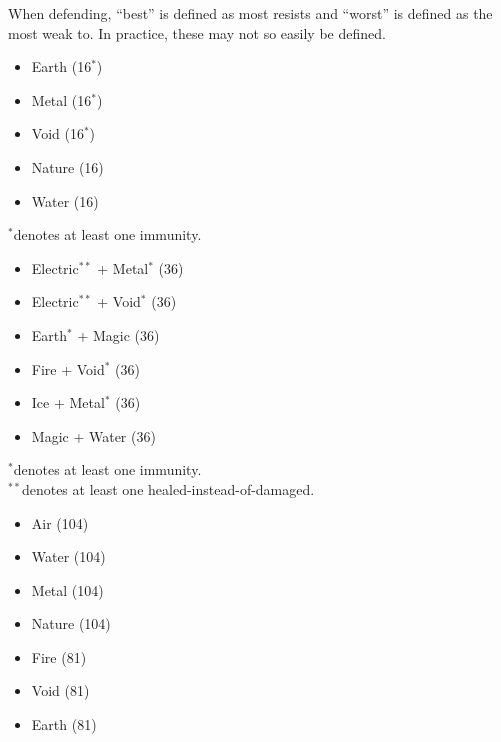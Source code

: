 When defending, ``best'' is defined as most resists and ``worst'' is defined as the most weak to. In practice, these may not so easily be defined.

\begin{itemize}
	\item{Earth (16$^*$)}
	\item{Metal (16$^*$)}
	\item{Void (16$^*$)}
	\item{Nature (16)}
	\item{Water (16)}
\end{itemize}
$^*$denotes at least one immunity.

\begin{itemize}
	\item{Electric$^{**}$ + Metal$^*$ (36)}
	\item{Electric$^{**}$ + Void$^*$ (36)}
	\item{Earth$^*$ + Magic (36)}
	\item{Fire + Void$^*$ (36)}
	\item{Ice + Metal$^*$ (36)}
	\item{Magic + Water (36)}
\end{itemize}
$^*$denotes at least one immunity.\\
$^{**}$denotes at least one healed-instead-of-damaged.

\begin{itemize}
	\item{Air (104)}
	\item{Water (104)}
	\item{Metal (104)}
	\item{Nature (104)}
	\item{Fire (81)}
	\item{Void (81)}
	\item{Earth (81)}
\end{itemize}

